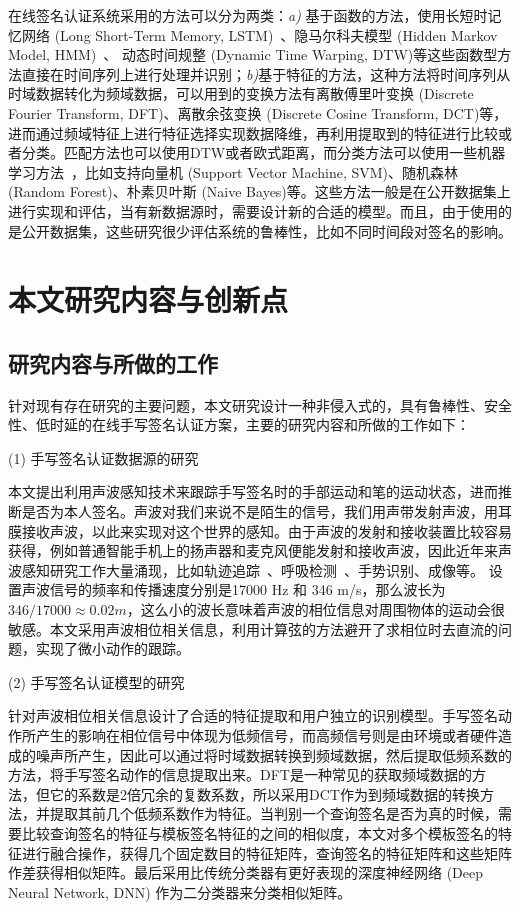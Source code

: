 在线签名认证系统采用的方法可以分为两类：\textit{a)} 基于函数的方法，使用长短时记忆网络 (Long Short-Term Memory, LSTM)~\cite{hochreiter1997long}、隐马尔科夫模型 (Hidden Markov Model, HMM)~\cite{rabiner1986introduction}、 动态时间规整 (Dynamic Time Warping, DTW)等这些函数型方法直接在时间序列上进行处理并识别；\textit{b)}基于特征的方法，这种方法将时间序列从时域数据转化为频域数据，可以用到的变换方法有离散傅里叶变换 (Discrete Fourier Transform, DFT)、离散余弦变换 (Discrete Cosine Transform, DCT)等，进而通过频域特征上进行特征选择实现数据降维，再利用提取到的特征进行比较或者分类。匹配方法也可以使用DTW或者欧式距离，而分类方法可以使用一些机器学习方法~\cite{周志华2016机器学习}，比如支持向量机 (Support Vector Machine, SVM)、随机森林 (Random Forest)、朴素贝叶斯 (Naive Bayes)等。这些方法一般是在公开数据集上进行实现和评估，当有新数据源时，需要设计新的合适的模型。而且，由于使用的是公开数据集，这些研究很少评估系统的鲁棒性，比如不同时间段对签名的影响。

\section{本文研究内容与创新点}
\subsection{研究内容与所做的工作}
针对现有存在研究的主要问题，本文研究设计一种非侵入式的，具有鲁棒性、安全性、低时延的在线手写签名认证方案，主要的研究内容和所做的工作如下：

(1) 手写签名认证数据源的研究

本文提出利用声波感知技术来跟踪手写签名时的手部运动和笔的运动状态，进而推断是否为本人签名。声波对我们来说不是陌生的信号，我们用声带发射声波，用耳膜接收声波，以此来实现对这个世界的感知。由于声波的发射和接收装置比较容易获得，例如普通智能手机上的扬声器和麦克风便能发射和接收声波，因此近年来声波感知研究工作大量涌现，比如轨迹追踪~\cite{wang2016device,mao2016cat,yun2017strata}、呼吸检测~\cite{WangContactless,wang2018c}、手势识别\cite{ruan2016audiogest,gupta2012soundwave,aumi2013doplink,ling2018ultragesture}、成像\cite{mao2017aim}等。
设置声波信号的频率和传播速度分别是17000 Hz 和 346 m/s，那么波长为  $346/17000\approx0.02m$，这么小的波长意味着声波的相位信息对周围物体的运动会很敏感。本文采用声波相位相关信息，利用计算弦的方法避开了求相位时去直流的问题，实现了微小动作的跟踪。


(2) 手写签名认证模型的研究

针对声波相位相关信息设计了合适的特征提取和用户独立的识别模型。手写签名动作所产生的影响在相位信号中体现为低频信号，而高频信号则是由环境或者硬件造成的噪声所产生，因此可以通过将时域数据转换到频域数据，然后提取低频系数的方法，将手写签名动作的信息提取出来。DFT是一种常见的获取频域数据的方法，但它的系数是2倍冗余的复数系数，所以采用DCT作为到频域数据的转换方法，并提取其前几个低频系数作为特征。当判别一个查询签名是否为真的时候，需要比较查询签名的特征与模板签名特征的之间的相似度，本文对多个模板签名的特征进行融合操作，获得几个固定数目的特征矩阵，查询签名的特征矩阵和这些矩阵作差获得相似矩阵。最后采用比传统分类器有更好表现的深度神经网络 (Deep Neural Network, DNN)\cite{Schmidhuber2015Deep} 作为二分类器来分类相似矩阵。

